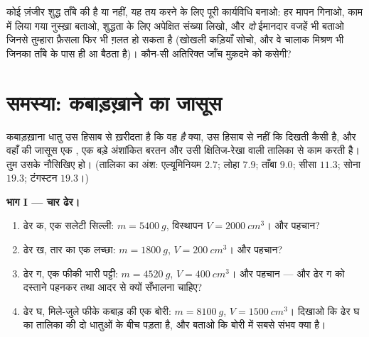 \begin{exercise}[$\star\star\star$]\label{exo:g7:volume-mass-density:12}
कोई ज़ंजीर शुद्ध ताँबे की है या नहीं, यह तय करने के लिए पूरी कार्यविधि
बनाओ: हर मापन गिनाओ, काम में लिया गया नुस्ख़ा बताओ, शुद्धता के लिए
अपेक्षित संख्या लिखो, और \emph{दो} ईमानदार वजहें भी बताओ जिनसे
तुम्हारा फ़ैसला फिर भी ग़लत हो सकता है (खोखली कड़ियाँ सोचो, और वे
चालाक मिश्रण भी जिनका  ताँबे के पास ही आ बैठता है)। कौन-सी
अतिरिक्त जाँच मुक़दमे को कसेगी?
\end{exercise}

\section{समस्या: कबाड़ख़ाने का जासूस}

\begin{problem}\label{pb:g7:volume-mass-density:1}
कबाड़ख़ाना धातु उस हिसाब से ख़रीदता है कि वह \emph{है} क्या, उस हिसाब से
नहीं कि दिखती कैसी है, और वहाँ की जासूस एक , एक बड़े अंशांकित बरतन
और उसी क्षितिज-रेखा वाली तालिका से काम करती है। तुम उसके नौसिखिए हो।
(तालिका का अंश: एल्यूमिनियम $2.7$; लोहा $7.9$; ताँबा $9.0$; सीसा
$11.3$; सोना $19.3$; टंगस्टन $19.3$।)

\medskip\noindent\textbf{भाग I --- चार ढेर।}
\begin{enumerate}
  \item ढेर क, एक सलेटी सिल्ली: $m = \qty{5400}{g}$, विस्थापन
        $V = \qty{2000}{cm^3}$।  और पहचान?
  \item ढेर ख, तार का एक लच्छा: $m = \qty{1800}{g}$,
        $V = \qty{200}{cm^3}$।  और पहचान?
  \item ढेर ग, एक फीकी भारी पट्टी: $m = \qty{4520}{g}$,
        $V = \qty{400}{cm^3}$।  और पहचान --- और ढेर ग को
        दस्ताने पहनकर तथा आदर से क्यों सँभालना चाहिए?
  \item ढेर घ, मिले-जुले फीके कबाड़ की एक बोरी: $m = \qty{8100}{g}$,
        $V = \qty{1500}{cm^3}$। दिखाओ कि ढेर घ का  तालिका की दो
        धातुओं के बीच पड़ता है, और बताओ कि बोरी में सबसे संभव क्या
        है।
\end{enumerate}


\end{problem}
